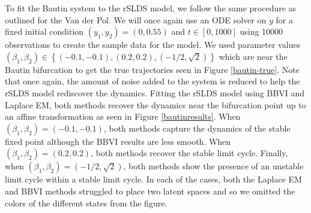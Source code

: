 To fit the Bautin system to the rSLDS model, we follow the same procedure as outlined for the Van der Pol. We will once again use an ODE solver on $\dot{y}$ for a fixed initial condition $(y_1,y_2) = (0,0.55)$ and $t\in[0,1000]$ using 10000 observations to create the sample data for the model. We used parameter values $(\beta_1,\beta_2) \in \left\{(-0.1,-0.1),(0.2,0.2),\left(-1/2,\sqrt{2}\right)\right\}$ which are near the Bautin bifurcation to get the true trajectories seen in Figure \ref{bautin-true}. Note that once again, the amount of noise added to the system is reduced to help the rSLDS model rediscover the dynamics. Fitting the rSLDS model using BBVI and Laplace EM, both methods recover the dynamics near the bifurcation point up to an affine transformation as seen in Figure \ref{bautinresults}. When $(\beta_1,\beta_2) = (-0.1,-0.1)$, both methods capture the dynamics of the stable fixed point although the BBVI results are less smooth. When $(\beta_1,\beta_2) = (0.2,0.2)$, both methods recover the stable limit cycle. Finally, when $(\beta_1,\beta_2) = (-1/2,\sqrt{2})$, both methods show the presence of an unstable limit cycle within a stable limit cycle. In each of the cases, both the Laplace EM and BBVI methods struggled to place two latent spaces and so we omitted the colors of the different states from the figure.  

